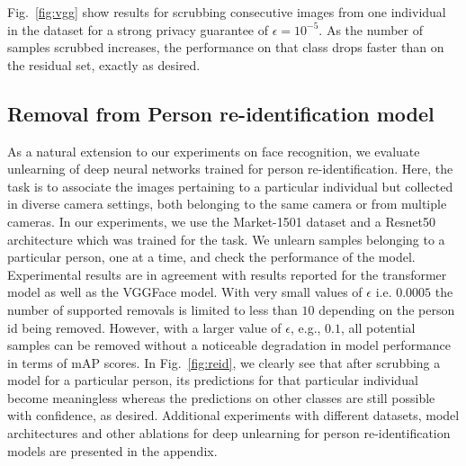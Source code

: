 Fig.~\ref{fig:vgg} show results for scrubbing consecutive images from one individual in the dataset for a strong privacy guarantee of $\epsilon=10^{-5}$. As the number of samples scrubbed increases, the performance on that class drops faster than on the residual set, exactly as desired.

\subsection{Removal from Person re-identification model}
As a natural extension to our experiments on face recognition, we evaluate unlearning of deep neural networks trained for person re-identification. Here, the task is to associate the images pertaining to a particular individual but collected in diverse camera settings, both belonging to the same camera or from multiple cameras. In our experiments, we use the Market-1501 dataset \cite{zheng2015scalable} and a Resnet50 architecture which was trained for the task. We unlearn samples belonging to a particular person, one at a time, and check the performance of the model. Experimental results are in agreement with results reported for the transformer model as well as the VGGFace model. With very small values of $\epsilon$ i.e. $0.0005$ the number of supported removals is limited to less than $10$ depending on the person id being removed. However, with a larger value of $\epsilon$, e.g., $0.1$, all potential samples can be removed without a noticeable degradation in model performance in terms of mAP scores. In Fig.~\ref{fig:reid}, we clearly see that after scrubbing a model for a particular person, its predictions for that particular individual become meaningless whereas the predictions on other classes are still possible with confidence, as desired. Additional experiments with different datasets, model architectures and other ablations for deep unlearning for person re-identification models are presented in the appendix.

